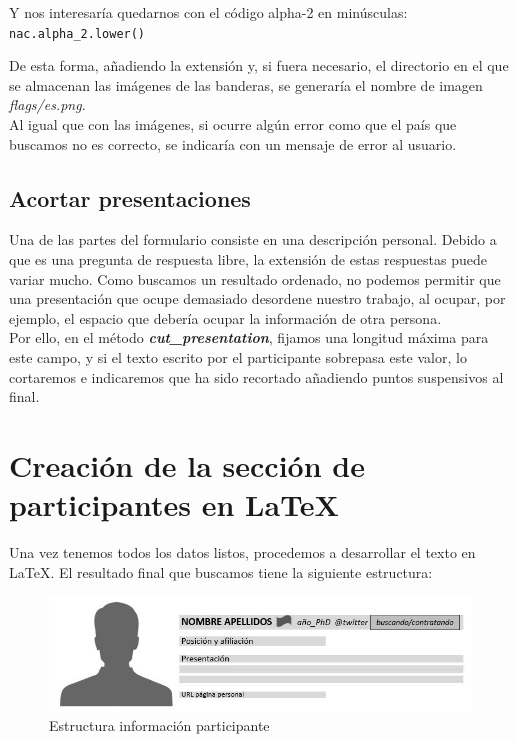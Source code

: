\documentclass[a4paper, 12pt]{book}
\begin{document}
Y nos interesaría quedarnos con el código alpha-2 en minúsculas:\\
\texttt{nac.alpha\_2.lower()}

De esta forma, añadiendo la extensión y, si fuera necesario, el directorio en el que se almacenan las imágenes de las banderas, se generaría el nombre de imagen \textit{flags/es.png}.\\

Al igual que con las imágenes, si ocurre algún error como que el país que buscamos no es correcto, se indicaría con un mensaje de error al usuario.

\subsection{Acortar presentaciones}
\label{subsec:presentacion}
Una de las partes del formulario consiste en una descripción personal. Debido a que es una pregunta de respuesta libre, la extensión de estas respuestas puede variar mucho. Como buscamos un resultado ordenado, no podemos permitir que una presentación que ocupe demasiado desordene nuestro trabajo, al ocupar, por ejemplo, el espacio que debería ocupar la información de otra persona.\\

Por ello, en el método \textbf{\textit{cut\_presentation}}, fijamos una longitud máxima para este campo, y si el texto escrito por el participante sobrepasa este valor, lo cortaremos e indicaremos que ha sido recortado añadiendo puntos suspensivos al final.


\section{Creación de la sección de participantes en \LaTeX}
\label{sec:creaParticipantes}
Una vez tenemos todos los datos listos, procedemos a desarrollar el texto en \LaTeX. El resultado final que buscamos tiene la siguiente estructura:
\begin{figure}[h!]
	\centering
	\includegraphics[width=15cm, keepaspectratio]{img/esquemaLatex}
	\caption{Estructura información participante}
	\label{fig:ejemploLatex}
\end{figure}
\end{document}

